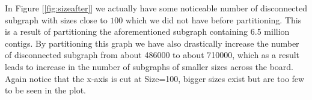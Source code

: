 \documentclass[a4paper,10pt]{article}
\newcommand\bref[1]{[\ref{#1}]}
\begin{document}
In Figure \bref{fig:sizeafter} we actually have some noticeable number of disconnected subgraph with sizes close to $100$ which we did not have before partitioning. This is a result of partitioning the aforementioned subgraph containing 6.5 million contigs. By partitioning this graph we have also drastically increase the number of disconnected subgraph from about 486000 to about 710000, which as a result leads to increase in the number of subgraphs of smaller sizes across the board. Again notice that the x-axis is cut at Size=100, bigger sizes exist but are too few to be seen in the plot.

\bigskip
\end{document}
